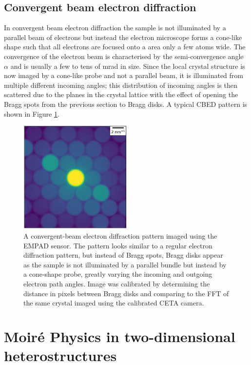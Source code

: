 \subsection{Convergent beam electron diffraction}
In convergent beam electron diffraction the sample is not illuminated by a parallel beam of electrons but instead the electron microscope forms a cone-like shape such that all electrons are focused onto a area only a few atoms wide. The convergence of the electron beam is characterised by the semi-convergence angle $\alpha$ and is usually a few to tens of \si{\milli\radian} in size.
Since the local crystal structure is now imaged by a cone-like probe and not a parallel beam, it is illuminated from multiple different incoming angles; this distribution of incoming angles is then scattered due to the planes in the crystal lattice with the effect of opening the Bragg spots from the previous section to Bragg disks. A typical CBED pattern is shown in Figure \ref{fig:pacbed}.

\begin{figure}
    \centering
    \includegraphics[width=0.5\textwidth, keepaspectratio]{resources/Figures/pacbed_hole.png}
    \caption{A convergent-beam electron diffraction pattern imaged using the EMPAD sensor. The pattern looks similar to a regular electron diffraction pattern, but instead of Bragg spots, Bragg disks appear as the sample is not illuminated by a parallel bundle but instead by a cone-shape probe, greatly varying the incoming and outgoing electron path angles. Image was calibrated by determining the distance in pixels between Bragg disks and comparing to the FFT of the same crystal imaged using the calibrated CETA camera.}
    \label{fig:pacbed}
\end{figure}

\section{Moiré Physics in two-dimensional heterostructures}

